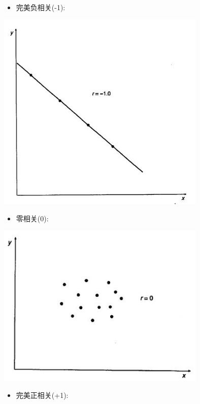 \begin{itemize}
\tightlist
\item
  完美负相关(-1):
\end{itemize}


\includegraphics[width=10cm]{maxwell_f67.jpg}

\begin{itemize}
\tightlist
\item
  零相关(0):
\end{itemize}


\includegraphics[width=10cm]{maxwell_f69.jpg}

\begin{itemize}
\tightlist
\item
  完美正相关(+1):
\end{itemize}

